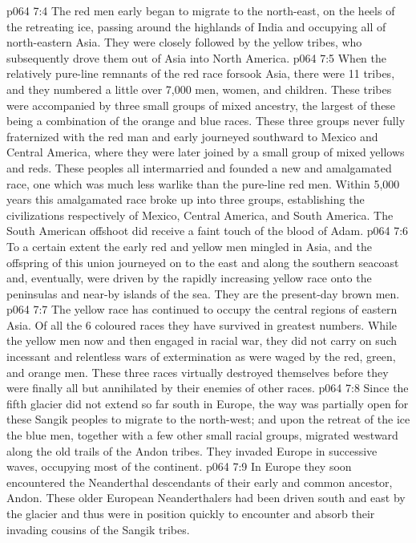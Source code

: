 \vs p064 7:4 The red men early began to migrate to the north\hyp{}east, on the heels of the retreating ice, passing around the highlands of India and occupying all of north\hyp{}eastern Asia. They were closely followed by the yellow tribes, who subsequently drove them out of Asia into North America.
\vs p064 7:5 When the relatively pure\hyp{}line remnants of the red race forsook Asia, there were 11 tribes, and they numbered a little over 7,000 men, women, and children. These tribes were accompanied by three small groups of mixed ancestry, the largest of these being a combination of the orange and blue races. These three groups never fully fraternized with the red man and early journeyed southward to Mexico and Central America, where they were later joined by a small group of mixed yellows and reds. These peoples all intermarried and founded a new and amalgamated race, one which was much less warlike than the pure\hyp{}line red men. Within 5,000 years this amalgamated race broke up into three groups, establishing the civilizations respectively of Mexico, Central America, and South America. The South American offshoot did receive a faint touch of the blood of Adam.
\vs p064 7:6 To a certain extent the early red and yellow men mingled in Asia, and the offspring of this union journeyed on to the east and along the southern seacoast and, eventually, were driven by the rapidly increasing yellow race onto the peninsulas and near\hyp{}by islands of the sea. They are the present\hyp{}day brown men.
\vs p064 7:7 The yellow race has continued to occupy the central regions of eastern Asia. Of all the 6 coloured races they have survived in greatest numbers. While the yellow men now and then engaged in racial war, they did not carry on such incessant and relentless wars of extermination as were waged by the red, green, and orange men. These three races virtually destroyed themselves before they were finally all but annihilated by their enemies of other races.
\vs p064 7:8 Since the fifth glacier did not extend so far south in Europe, the way was partially open for these Sangik peoples to migrate to the north\hyp{}west; and upon the retreat of the ice the blue men, together with a few other small racial groups, migrated westward along the old trails of the Andon tribes. They invaded Europe in successive waves, occupying most of the continent.
\vs p064 7:9 In Europe they soon encountered the Neanderthal descendants of their early and common ancestor, Andon. These older European Neanderthalers had been driven south and east by the glacier and thus were in position quickly to encounter and absorb their invading cousins of the Sangik tribes.

